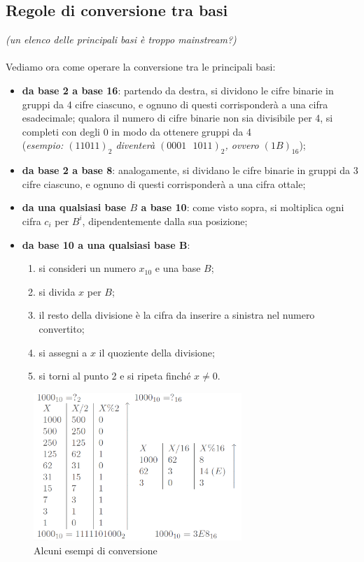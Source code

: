 \subsection{Regole di conversione tra basi}
\textit{(un elenco delle principali basi è troppo mainstream?)}\\\\
Vediamo ora come operare la conversione tra le principali basi:
\begin{itemize}[noitemsep,nolistsep]
	\item \textbf{da base 2 a base 16}: partendo da destra, si dividono le cifre binarie in gruppi da 4 cifre ciascuno, e ognuno di questi corrisponderà a una cifra esadecimale; qualora il numero di cifre binarie non sia divisibile per 4, si completi con degli 0 in modo da ottenere gruppi da 4\\ (\textit{esempio: $(11011)_{2}$ diventerà $(0001\text{ }1011)_{2}$, ovvero $(1B)_{16}$});
	\item \textbf{da base 2 a base 8}: analogamente, si dividano le cifre binarie in gruppi da 3 cifre ciascuno, e ognuno di questi corrisponderà a una cifra ottale;
	\item \textbf{da una qualsiasi base $B$ a base 10}: come visto sopra, si moltiplica ogni cifra $c_{i}$ per $B^{i}$, dipendentemente dalla sua posizione;
	\item \textbf{da base 10 a una qualsiasi base B}:
	\begin{enumerate}
		\item si consideri un numero $x_{10}$ e una base $B$;
		\item si divida $x$ per $B$;
		\item il resto della divisione è la cifra da inserire a sinistra nel numero convertito;
		\item si assegni a $x$ il quoziente della divisione;
		\item si torni al punto 2 e si ripeta finché $x\neq0$.
	\end{enumerate}
\end{itemize}
\begin{figure}[H]
	\centering
	\includegraphics[width=0.7\textwidth,keepaspectratio]{images/esempi_conversioni.png}
	\caption{Alcuni esempi di conversione}
\end{figure}

